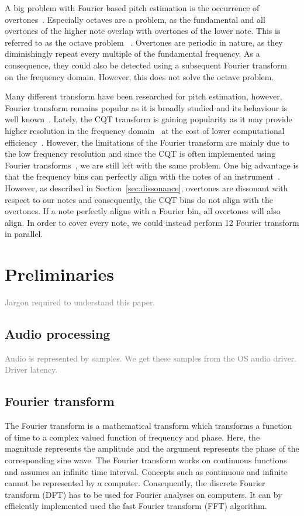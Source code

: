 \documentclass[10pt,twocolumn]{article}
\begin{document}
A big problem with Fourier based pitch estimation is the occurrence of overtones~\cite{oud}. Especially octaves are a problem, as the fundamental and all overtones of the higher note overlap with overtones of the lower note. This is referred to as the octave problem~
\cite{octave}. Overtones are periodic in nature, as they diminishingly repeat every multiple of the fundamental frequency. As a consequence, they could also be detected using a subsequent Fourier transform~\cite{doublefourier} on the frequency domain. However, this does not solve the octave problem.

Many different transform have been researched for pitch estimation, however, Fourier transform remains popular as it is broadly studied and its behaviour is well known~\cite{survey}. Lately, the CQT transform is gaining popularity as it may provide higher resolution in the frequency domain~\cite{cqtres} at the cost of lower computational efficiency~\cite{cqtslow}. However, the limitations of the Fourier transform are mainly due to the low frequency resolution and since the CQT is often implemented using Fourier transforms~\cite{cqtfft}, we are still left with the same problem. One big advantage is that the frequency bins can perfectly align with the notes of an instrument~\cite{cqtalign}. However, as described in Section~\ref{sec:dissonance}, overtones are dissonant with respect to our notes and consequently, the CQT bins do not align with the overtones. If a note perfectly aligns with a Fourier bin, all overtones will also align. In order to cover every note, we could instead perform 12 Fourier transform in parallel.


\section{Preliminaries}
\textcolor{gray}{Jargon required to understand this paper.}

\subsection{Audio processing}
\textcolor{gray}{Audio is represented by samples. We get these samples from the OS audio driver. Driver latency.}

\subsection{Fourier transform}
The Fourier transform is a mathematical transform which transforms a function of time to a complex valued function of frequency and phase. Here, the magnitude represents the amplitude and the argument represents the phase of the corresponding sine wave. The Fourier transform works on continuous functions and assumes an infinite time interval. Concepts such as continuous and infinite cannot be represented by a computer. Consequently, the discrete Fourier transform (DFT) has to be used for Fourier analyses on computers. It can by efficiently implemented used the fast Fourier transform (FFT) algorithm.
\end{document}
